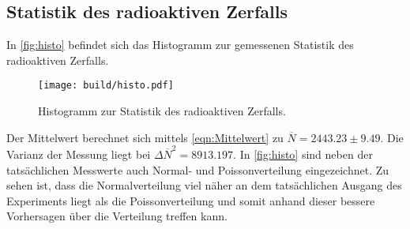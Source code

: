 \subsection{Statistik des radioaktiven Zerfalls}
In \autoref{fig:histo} befindet sich das Histogramm zur gemessenen Statistik des radioaktiven Zerfalls.

\begin{figure}
  \centering
  \texttt{[image: build/histo.pdf]}
  \caption{Histogramm zur Statistik des radioaktiven Zerfalls.}
  \label{fig:histo}
\end{figure}

Der Mittelwert berechnet sich mittels \autoref{eqn:Mittelwert} zu $\overline{N} = 2443.23 \pm 9.49$. Die Varianz
der Messung liegt bei ${\Delta\overline{N}}^2 = 8913.197$.
In \autoref{fig:histo} sind neben der tatsächlichen Messwerte auch Normal- und Poissonverteilung eingezeichnet.
Zu sehen ist, dass die Normalverteilung viel näher an dem tatsächlichen Ausgang des Experiments liegt als die Poissonverteilung und somit 
anhand dieser bessere Vorhersagen über die Verteilung treffen kann.